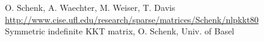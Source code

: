 	{
		{
			O. Schenk, A. Waechter, M. Weiser, T. Davis	
		}
		{
			\url{http://www.cise.ufl.edu/research/sparse/matrices/Schenk/nlpkkt80} \\
			Symmetric indefinite KKT matrix, O. Schenk, Univ. of Basel
		}
	} 
	\begin{comment}
	\taskdescription{TS--ST}{\textsc{Cube\_Coup\_dt0.mtx}}
	{
		\taskdescfield{Authors}
		{
			Carlo Janna and Massimiliano Ferronato
		}
		\taskdescfield{Description}
		{
			\url{http://www.cise.ufl.edu/research/sparse/matrices/Janna/Cube_Coup_dt0} \\
			3D coupled consolidation problem (3D cube)
		}
		\taskdescfield{Type}{\textbf{coordinate real symmetric}}
		\taskdescfield{Dimension}{\textbf{2164760} x \textbf{2164760}}
		\taskdescfield{Non-zeros}{\textbf{64685452}}		
	} 
	\end{comment}